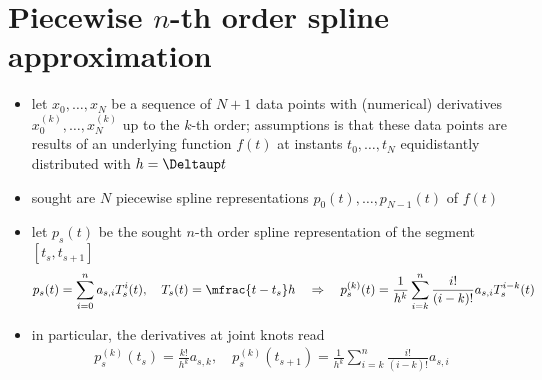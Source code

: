 \documentclass[11pt, a4paper]{article}
\begin{document}
\section*{Piecewise $n$-th order spline approximation}
\begin{itemize}
	\item let ${x_0,\ldots,x_N}$ be a sequence of ${N+1}$ data points with (numerical) derivatives ${x^{(k)}_0,\ldots,x^{(k)}_N}$ up to the $k$-th order; assumptions is that these data points are results of an underlying function ${f(t)}$ at instants ${t_0,\ldots,t_N}$ equidistantly distributed with ${h=\Deltaup t}$
	\item sought are $N$ piecewise spline representations ${p_0(t),\dots,p_{N-1}(t)}$ of ${f(t)}$
	\item let ${p_s(t)}$ be the sought $n$-th order spline representation of the segment ${[t_s,t_{s+1}]}$
		\begin{align}
			p_s(t)=\sum_{i=0}^n a_{s,i}T_s^i(t),\quad T_s(t)=\mfrac{t-t_s}h\quad\Rightarrow\quad p_s^{(k)}(t)=\frac1{h^k}\sum_{i=k}^n\frac{i!}{(i-k)!}a_{s,i}T_s^{i-k}(t)
		\end{align}
	\item in particular, the derivatives at joint knots read
		\begin{align}
			p_s^{(k)}(t_s)=\frac{k!}{h^k}a_{s,k},\quad p_s^{(k)}(t_{s+1})=\frac1{h^k}\sum_{i=k}^n\frac{i!}{(i-k)!}a_{s,i}
		\end{align}
\end{itemize}
\end{document}
